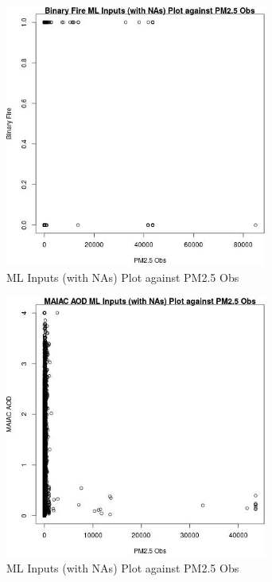 \begin{figure} 
\centering  
\includegraphics[width=0.77\textwidth]{Code_Outputs/Report_ML_input_PM25_Step4_part_f_de_duplicated_aves_prioritize_24hr_obswNAs_Binary_FirevPM25_Obs.jpg} 
\caption{\label{fig:Report_ML_input_PM25_Step4_part_f_de_duplicated_aves_prioritize_24hr_obswNAsBinary_FirevPM25_Obs}ML Inputs (with NAs) Plot against PM2.5 Obs} 
\end{figure} 
 

\begin{figure} 
\centering  
\includegraphics[width=0.77\textwidth]{Code_Outputs/Report_ML_input_PM25_Step4_part_f_de_duplicated_aves_prioritize_24hr_obswNAs_MAIAC_AODvPM25_Obs.jpg} 
\caption{\label{fig:Report_ML_input_PM25_Step4_part_f_de_duplicated_aves_prioritize_24hr_obswNAsMAIAC_AODvPM25_Obs}ML Inputs (with NAs) Plot against PM2.5 Obs} 
\end{figure} 
 

